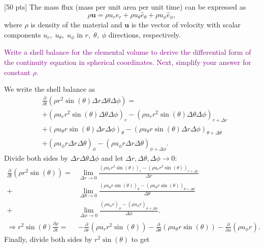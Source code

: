 \documentclass[12pt]{article}
\begin{document}
\newpage
\begin{ex}
    
[50 pts] The mass flux (mass per unit area per unit time) can be expressed as
$$\rho \mathbf{u}=\rho u_r\hat{e}_r+\rho u_{\theta}\hat{e}_{\theta}+\rho u_{\phi}\hat{e}_{\phi},$$
where $\rho$ is density of the material and $\mathbf{u}$ is the vector of velocity with scalar components $u_r,\;u_{\theta},\;u_{\phi}$ in $r,\;\theta,\;\phi$ directions, respectively.

\textcolor{purple}{Write a shell balance for the elemental volume to derive the differential form of the continuity equation in spherical coordinates. Next, simplify your answer for constant $\rho$.}
		
\begin{solution}
  We write the shell balance as
  \begin{align*}
    &\frac{\partial}{\partial t}(\rho r^2\sin(\theta)\Delta r\Delta\theta\Delta\phi)=\\
    &+(\rho u_r r^2\sin(\theta)\Delta\theta\Delta\phi)_{r}-(\rho u_r r^2\sin(\theta)\Delta\theta\Delta\phi)_{r+\Delta r}\\
    &+(\rho u_{\theta} r\sin(\theta)\Delta r\Delta\phi)_{\theta}-(\rho u_{\theta} r\sin(\theta)\Delta r\Delta\phi)_{\theta+\Delta\theta}\\
    &+(\rho u_{\phi} r\Delta r\Delta\theta)_{\phi}-(\rho u_{\phi} r\Delta r\Delta\theta)_{\phi+\Delta\phi}.
  \end{align*}
  Divide both sides by $\Delta r\Delta\theta\Delta\phi$ and let $\Delta r,\Delta\theta,\Delta\phi\to 0$:
  \begin{align*}
    \frac{\partial}{\partial t}(\rho r^2\sin(\theta))=&\lim_{\Delta r\to 0}{\frac{(\rho u_r r^2\sin(\theta))_{r}-(\rho u_r r^2\sin(\theta))_{r+\Delta r}}{\Delta r}}\\
    +&\lim_{\Delta\theta\to 0}{\frac{(\rho u_{\theta} r\sin(\theta))_{\theta}-(\rho u_{\theta} r\sin(\theta))_{\theta+\Delta\theta}}{\Delta\theta}}\\
    +&\lim_{\Delta\phi\to 0}{\frac{(\rho u_{\phi} r)_{\phi}-(\rho u_{\phi} r)_{\phi+\Delta\phi}}{\Delta\phi}}.\\
    \Rightarrow r^2\sin(\theta)\frac{\partial\rho}{\partial t}=&-\frac{\partial}{\partial r}(\rho u_r r^2\sin(\theta))-\frac{\partial}{\partial\theta}(\rho u_{\theta} r\sin(\theta))-\frac{\partial}{\partial\phi}(\rho u_{\phi} r).
  \end{align*}
  Finally, divide both sides by $r^2\sin(\theta)$ to get\textcolor{teal}{
}
\end{solution}
\end{ex}
\end{document}
